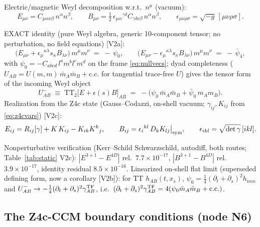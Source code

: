 Electric/magnetic Weyl decomposition w.r.t.\ $n^\mu$ (vacuum):
\begin{equation}
E_{\mu\nu} = C_{\mu\alpha\nu\beta}\,n^\alpha n^\beta,
\qquad
B_{\mu\nu} = \tfrac12\,\epsilon_{\mu\alpha}{}^{\gamma\delta}
             C_{\gamma\delta\nu\beta}\,n^\alpha n^\beta,
\qquad
\epsilon_{\mu\nu\rho\sigma}=\sqrt{-g}\,[\mu\nu\rho\sigma].
\label{eq:ebdef}
\end{equation}
\begin{nfblock}
EXACT identity (pure Weyl algebra, generic 10-component tensor; no
perturbation, no field equations) [V2a]:
\begin{equation}
\big(E_{\mu\nu} + \epsilon_{\mu}{}^{\kappa\lambda}s_\kappa
 B_{\lambda\nu}\big)\,m^\mu m^\nu \;=\; -\,\psi_0,
\qquad
\big(E_{\mu\nu} - \epsilon_{\mu}{}^{\kappa\lambda}s_\kappa
 B_{\lambda\nu}\big)\,m^\mu m^\nu \;=\; -\,\bar\psi_4,
\label{eq:exact-dictionary}
\end{equation}
with $\psi_0 = -C_{abcd}\,l^a m^b l^c m^d$ on the frame \eqref{eq:nullvecs};
dyad completeness ($U_{AB} = U(m,m)\,\bar m_A \bar m_B + \mathrm{c.c.}$ for
tangential trace-free $U$) gives the tensor form of the incoming Weyl object
\begin{equation}
U^-_{AB} \;\equiv\; \mathrm{TT}_2\big[E + \epsilon(s)B\big]_{AB}
 \;=\; -\big(\psi_0\,\bar m_A \bar m_B + \bar\psi_0\, m_A m_B\big).
\label{eq:uminus}
\end{equation}
Realization from the Z4c state (Gauss--Codazzi, on-shell vacuum;
$\gamma_{ij}, K_{ij}$ from \eqref{eq:z4cvars}) [V2c]:
\begin{equation}
E_{ij} = R_{ij}[\gamma] + K\,K_{ij} - K_{ik}K^k{}_j,
\qquad
B_{ij} = \epsilon_i{}^{kl}\,D_k K_{lj}\big|_{\rm sym},
\qquad
\epsilon_{ikl} = \sqrt{\det\gamma}\,[ikl].
\label{eq:gausscodazzi}
\end{equation}
\end{nfblock}
Nonperturbative verification (Kerr--Schild Schwarzschild, autodiff, both
routes; Table~\ref{tab:static} V2c): $|E^{3+1}{-}E^{4D}|$ rel.\
$7.7{\times}10^{-17}$, $|B^{3+1}{-}B^{4D}|$ rel.\ $3.9{\times}10^{-17}$,
identity residual $8.5{\times}10^{-16}$. Linearized on-shell flat limit
(superseded defining form, now a corollary [V2b]): for TT $h_{AB}(t,x_s)$,
$\psi_0 = \tfrac14(\partial_t+\partial_s)^2 h_{mm}$ and
$U^-_{AB}\to -\tfrac14 (\partial_t + \partial_s)^2 \gamma^{\rm TF}_{AB}$,
i.e.\ $(\partial_t+\partial_s)^2\gamma^{\rm TF}_{AB}
 = 4(\psi_0 \bar m_A\bar m_B + \mathrm{c.c.})$.

\subsection{The Z4c-CCM boundary conditions (node N6)}
\label{sec:n6}

